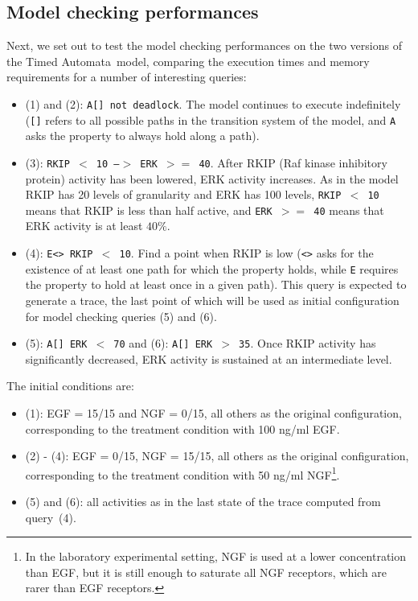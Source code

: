 \documentclass{llncs}
\newcommand{\tas}{Timed Automata}
\begin{document}
\subsection{Model checking performances}\label{subsec:model-checking-performances}
Next, we set out to test the model checking performances on the two versions of the \tas\ model, comparing the
execution times and memory requirements for a number of interesting queries:
\begin{itemize}
  \item (1) and (2): {\tt A[] not deadlock}. The model continues to execute indefinitely ({\tt []} refers to all
      possible paths in the transition system of the model, and {\tt A} asks the property to always hold along a path).
  \item (3): {\tt RKIP $<$ 10 --$>$ ERK $>=$ 40}. After RKIP (Raf kinase inhibitory protein) activity has been lowered, ERK activity increases. As in the model RKIP
      has 20 levels of granularity and ERK has 100 levels, {\tt RKIP $<$ 10} means that RKIP is less than half active, and
      {\tt ERK $>=$ 40} means that ERK activity is at least $40 \%$.
  \item (4): {\tt E<> RKIP $<$ 10}. Find a point when RKIP is low ({\tt <>} asks for the existence of at least one path
      for which the property holds, while {\tt E} requires the property to hold at least once in a given path).
      This query is expected to generate a trace, the last point of which will be used as initial configuration for model checking queries (5) and (6).
  \item (5): {\tt A[] ERK $<$ 70} and (6): {\tt A[] ERK $>$ 35}. Once RKIP activity has significantly decreased, ERK activity is sustained at an intermediate level.
\end{itemize}
The initial conditions are:
\begin{itemize}
  \item (1): EGF = 15/15 and NGF = 0/15, all others as the original configuration, corresponding to the treatment condition with
	    100 ng/ml EGF.
  \item (2) - (4): EGF = 0/15, NGF = 15/15, all others as the original configuration, corresponding to the treatment condition with
	    50 ng/ml NGF\footnote{In the laboratory experimental setting, NGF is used at a lower concentration than EGF, but it is still enough to saturate all NGF receptors, which
	    are rarer than EGF receptors.}.
  \item (5) and (6): all activities as in the last state of the trace computed from query~(4).
\end{itemize}
\end{document}
